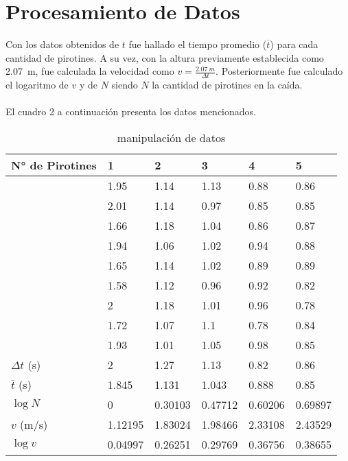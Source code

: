 \documentclass{article}
\begin{document}
\section{Procesamiento de Datos}
Con los datos obtenidos de $t$ fue hallado el tiempo promedio ($\overline{t}$) para cada cantidad de pirotines. A su vez, con la altura previamente establecida como \qty[mode = text] {2,07} {m}, fue calculada la velocidad como $v=\frac{\qty[mode = text] {2,07} {m}}{\Delta t}$. Posteriormente fue calculado el logaritmo de $v$ y de $N$ siendo $N$ la cantidad de pirotines en la caída. 
\\
\\
El cuadro 2 a continuación presenta los datos mencionados.
\begin{table}[H]
\centering
\begin{tabular}{|l|l|l|l|l|l|}
\hline
\rowcolor[HTML]{CACACA} 
N° de Pirotines & 1 & 2 & 3 & 4 & 5 \\
\hline
\cellcolor[HTML]{CACACA} & 1.95 & 1.14 & 1.13 & 0.88 & 0.86 \\ \cline{2-6} 
\cellcolor[HTML]{CACACA} & 2.01 & 1.14 & 0.97 & 0.85 & 0.85 \\ \cline{2-6} 
\cellcolor[HTML]{CACACA} & 1.66 & 1.18 & 1.04 & 0.86 & 0.87 \\ \cline{2-6} 
\cellcolor[HTML]{CACACA} & 1.94 & 1.06 & 1.02 & 0.94 & 0.88 \\ \cline{2-6} 
\cellcolor[HTML]{CACACA} & 1.65 & 1.14 & 1.02 & 0.89 & 0.89 \\ \cline{2-6} 
\cellcolor[HTML]{CACACA} & 1.58 & 1.12 & 0.96 & 0.92 & 0.82 \\ \cline{2-6} 
\cellcolor[HTML]{CACACA} & 2 & 1.18 & 1.01 & 0.96 & 0.78 \\ \cline{2-6} 
\cellcolor[HTML]{CACACA} & 1.72 & 1.07 & 1.1 & 0.78 & 0.84 \\ \cline{2-6} 
\cellcolor[HTML]{CACACA} & 1.93 & 1.01 & 1.05 & 0.98 & 0.85 \\ \cline{2-6} 
\multirow{-10}{*}{\cellcolor[HTML]{CACACA}$\Delta t$ (s)} & 2 & 1.27 & 1.13 & 0.82 & 0.86 \\ \hline
\rowcolor[HTML]{FFFFFF} 
\cellcolor[HTML]{CACACA}$\overline{t}$ (s) & 1.845 & 1.131 & 1.043 & 0.888 & 0.85 \\ \hline
\rowcolor[HTML]{EFEFEF} 
\cellcolor[HTML]{CACACA}$\log N$ & 0 & 0.30103 & 0.47712 & 0.60206 & 0.69897 \\ \hline
\rowcolor[HTML]{FFFFFF} 
\cellcolor[HTML]{CACACA}$v$ (m/s) & 1.12195 & 1.83024 & 1.98466 & 2.33108 & 2.43529 \\ \hline
\rowcolor[HTML]{EFEFEF} 
\cellcolor[HTML]{CACACA}$\log v$ & 0.04997 & 0.26251 & 0.29769 & 0.36756 & 0.38655 \\ \hline
\end{tabular}
\caption{manipulación de datos}
\label{table:procesamiento}
\end{table}
\end{document}

